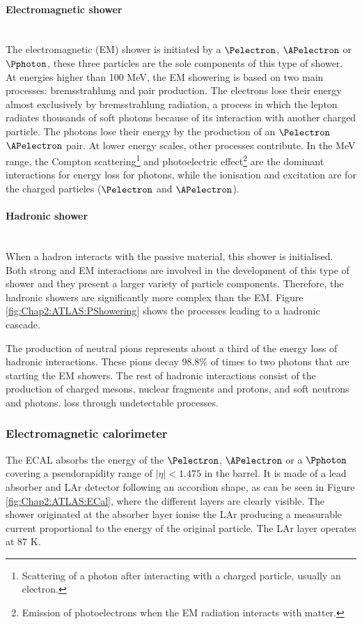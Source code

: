 \paragraph{Electromagnetic shower}\mbox{}\\
The electromagnetic (EM) shower is initiated by a $\Pelectron$, $\APelectron$ or  $\Pphoton$, these three particles are the sole components of this type of shower.
At energies higher than 100 MeV, the EM showering is based on two main processes: bremsstrahlung and pair production.
The electrons lose their energy almost exclusively by bremsstrahlung radiation, a process in which the lepton radiates thousands of soft photons because of its
interaction with another charged particle.
The photons lose their energy by the production of an $\Pelectron$$\APelectron$ pair.
At lower energy scales, other processes contribute. In the MeV range, the Compton scattering\footnote{Scattering of a photon after interacting with a charged particle, usually an electron.}
and photoelectric effect\footnote{Emission of photoelectrons when the EM radiation interacts with matter.} are the dominant interactions for energy loss
for photons, while the ionisation and excitation are for the charged particles ($\Pelectron$ and $\APelectron$).


\paragraph{Hadronic shower}\mbox{}\\
When a hadron interacts with the passive material, this shower is initialised. %
Both strong and EM interactions are involved in the development of this type of shower and 
they present a larger variety of particle components. Therefore, the hadronic showers are significantly more 
complex than the EM. Figure \ref{fig:Chap2:ATLAS:PShowering} shows the processes leading to a hadronic cascade.

The production of neutral pions represents about a third of the energy loss of hadronic interactions. These pions 
decay 98.8\% of times to two photons \cite{pdgPi0} that are starting the EM showers. The rest of hadronic interactions
consist of the production of charged mesons, nuclear fragments and protons, and soft neutrons and photons.
loss through undetectable processes.


\subsubsection{Electromagnetic calorimeter}
\label{sec:Chap2:CALO:ECAL}
The ECAL \cite{Cavallari_2011} absorbs the energy of the $\Pelectron$, $\APelectron$ or a $\Pphoton$ covering a pseudorapidity range 
of $|\eta|<1.475$ in the barrel. It is made of a lead absorber and LAr detector following an accordion shape, as can be seen in Figure \ref{fig:Chap2:ATLAS:ECal},
where the different layers are clearly visible. 
The shower originated at the absorber layer ionise the LAr producing a measurable current proportional to the energy of the original particle. 
The LAr layer operates at 87 K.

